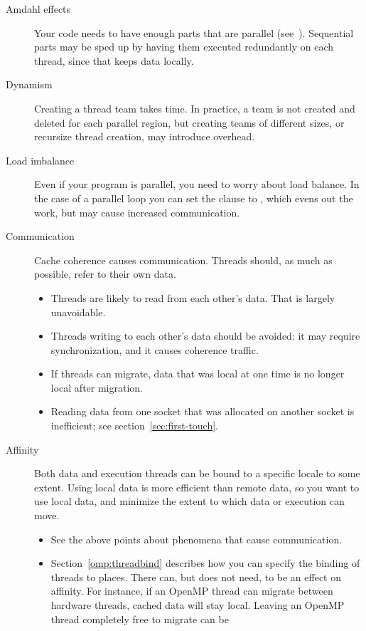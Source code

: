 \begin{description}
\item[Amdahl effects] Your code needs to have enough parts that are
  parallel (see~). Sequential parts may be sped up
  by having them executed redundantly on each thread, since that keeps
  data locally.
\item[Dynamism] Creating a thread team takes time. In practice, a team
  is not created and deleted for each parallel region, but creating
  teams of different sizes, or recursize thread creation, may
  introduce overhead.
\item[Load imbalance] Even if your program is parallel, you need to
  worry about load balance. In the case of a parallel loop you can set
  the  clause to , which evens out
  the work, but may cause increased communication.
\item[Communication] Cache coherence causes communication. Threads
  should, as much as possible, refer to their own data.
  \begin{itemize}
  \item Threads are likely to read from each other's data. That is
    largely unavoidable.
  \item Threads writing to each other's data should be avoided: it may
    require synchronization, and it causes coherence traffic.
  \item If threads can migrate, data that was local at one time is no
    longer local after migration.
  \item Reading data from one socket that was allocated on another
    socket is inefficient; see section~\ref{sec:first-touch}.
  \end{itemize}
\item[Affinity] Both data and execution threads can be bound to a
  specific locale to some extent. Using local data is more efficient
  than remote data, so you want to use local data, and minimize the extent to which data
  or execution can move.
  \begin{itemize}
  \item See the above points about phenomena that cause communication.
  \item Section~\ref{omp:threadbind} describes how you can specify the
    binding of threads to places. There can, but does not need, to be
    an effect on affinity. For instance, if an OpenMP thread can
    migrate between hardware threads, cached data will stay local.
    Leaving an OpenMP thread completely free to migrate can be

\end{itemize}
\end{description}
